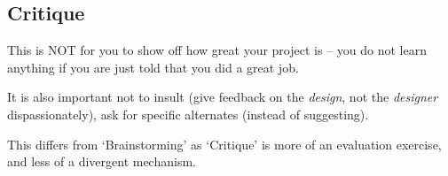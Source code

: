 \subsection{Critique}
\begin{important}
This is NOT for you to show off how great your project is -- you do not learn anything if you are just told that you did a great job.
\end{important}
It is also important not to insult (give feedback on the \textit{design}, not the \textit{designer} dispassionately), ask for specific alternates (instead of suggesting).

This differs from `Brainstorming' as `Critique' is more of an evaluation exercise, and less of a divergent mechanism.
